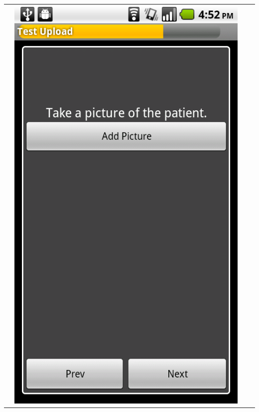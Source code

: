 \documentclass[a4paper,10pt]{article}
\begin{document}
\begin{flushleft}
\begin{tabular}{ c c c c }
&\includegraphics[scale=0.15,keepaspectratio=true]{client_proc_pt_picture.png}

\end{tabular}
\end{flushleft}
\end{document}

